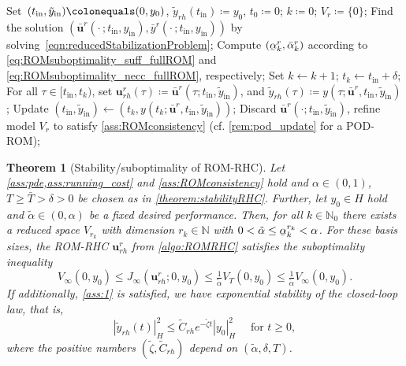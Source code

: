 \documentclass{m2an}
\newcommand{\N}{\mathbb N}
\newcommand{\bu}{\mathbf{u}}
\newcommand{\ubar}[1]{\underaccent{\bar}{#1}}
\newcommand{\tint}{t_{\mathrm{in}}}
\newcommand{\yint}{y_{\mathrm{in}}}
\newcommand{\tildeyint}{\tilde y_{\mathrm{in}}}
\newcommand{\norm}[2]{\left|#1\right|_{#2}}
\newtheorem{theorem}[thrm]{Theorem}
\begin{document}
\begin{algorithm}[htbp!]
\caption{ROM-RHC($\delta,T, \tilde\alpha$)}\label{algo:ROMRHC}
\begin{algorithmic}[1]
\STATE Set~$(\tint,\tildeyint)\colonequals(0,y_0)$, $ \tilde y_{rh}(\tint)\coloneqq y_0$, $t_0\coloneqq 0$; $k\coloneqq 0$; $V_r\coloneqq \{0\}$;
\WHILE{$ \tint <T_\infty$}\label{algoline:1}
\STATE \label{step4} Find the solution $(\bar { \bu}^r(\cdot\,;\tint,\yint),\bar { y}^r(\cdot\,;\tint,\yint))$ by solving~\eqref{eqn:reducedStabilizationProblem};
\STATE Compute $(\ubar \alpha_k^r,\bar \alpha_k^r)$ according to \eqref{eq:ROMsuboptimality_suff_fullROM} and \eqref{eq:ROMsuboptimality_necc_fullROM}, respectively;
\IF{$\ubar \alpha_k^r \geq  \tilde \alpha$}
\STATE Set $k\gets k+1$;  $t_k \gets \tint +\delta$;
\STATE For all $\tau\in[\tint,t_k)$, set $\bu^r_{rh}(\tau)\coloneqq \bar { \bu}^r(\tau;\tint,\tildeyint)$, and $\tilde y_{rh}(\tau)\coloneqq y(\tau;\bar{ \bu}^r,\tint, \tildeyint)$;
\STATE Update $(\tint,\tildeyint)\leftarrow(t_k, y(t_k;\bar{ \bu}^r,\tint, \tildeyint))$;
\ELSE
\STATE\label{algoline:2} Discard $\bar { \bu}^r( \cdot;\tint,\tildeyint)$, {refine model $V_r$ to satisfy \cref{ass:ROMconsistency} (cf. \cref{rem:pod_update} for a POD-ROM)};
\ENDIF
\ENDWHILE
\end{algorithmic}
\end{algorithm}
%
\begin{theorem}[Stability/suboptimality of ROM-RHC]\label{theorem:StabilityReducedRHC}
    Let \cref{ass:pde,ass:running_cost} and \cref{ass:ROMconsistency} hold and $ \alpha\in (0,1)$, $T\geq \bar T>\delta>0$ be chosen as in \cref{theorem:stabilityRHC}. Further, let $y_0\in H$ hold and $\tilde \alpha\in (0,\alpha)$ be a fixed desired performance.
     Then, for all $k\in \N_0$ there {exists a reduced space $V_{r_k}$ with dimension} $r_k\in \N$ with $0<\tilde \alpha \leq \ubar\alpha_k^{r_k}<\alpha$. {For these basis sizes}, the ROM-RHC $\bu^r_{rh}$ from \cref{algo:ROMRHC} satisfies the suboptimality inequality 
    \begin{equation}
        \label{eq:ROM_suboptimaity_inequality}
    V_\infty(0,y_0)\leq J_\infty(\bu^r_{rh};0,y_0)\leq \tfrac{1}{\tilde \alpha}V_T(0,y_0)\leq \tfrac{1}{\tilde \alpha}V_\infty(0,y_0).
    \end{equation}
    If additionally, \cref{ass:1} is satisfied, we have exponential stability of the closed-loop law, that is,
    \begin{equation}
        \label{eq:ROM_exponential_stability}
        \norm{\tilde y_{rh}(t)}{H}^2 \leq \tilde C_{rh} e^{-\tilde \zeta t}\norm{y_0}{H}^2 \quad  \text{ for }t\geq 0,
    \end{equation}
    where the positive numbers $(\tilde \zeta,\tilde C_{rh})$ depend on $(\tilde \alpha,\delta,T)$.
\end{theorem}
\end{document}
